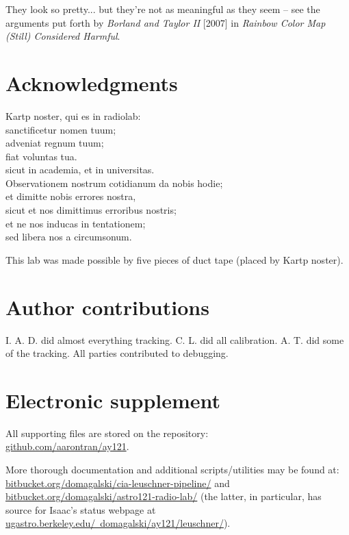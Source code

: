 \documentclass[10pt]{article}
\begin{document}
They look so pretty... but they're not as meaningful as they seem -- see the arguments put forth by \textit{Borland and Taylor II} [2007] in \textit{Rainbow Color Map (Still) Considered Harmful}.

\section{Acknowledgments}

\begin{center}
Kartp noster, qui es in radiolab:\\
sanctificetur nomen tuum;\\
adveniat regnum tuum;\\
fiat voluntas tua.\\
sicut in academia, et in universitas.\\
Observationem nostrum cotidianum da nobis hodie;\\
et dimitte nobis errores nostra,\\
sicut et nos dimittimus erroribus nostris;\\
et ne nos inducas in tentationem;\\
sed libera nos a circumsonum.
\end{center}

This lab was made possible by five pieces of duct tape (placed by Kartp noster).


\section{Author contributions}

I. A. D. did almost everything tracking.  C. L. did all calibration.  A. T. did some of the tracking.  All parties contributed to debugging.

\section{Electronic supplement}

All supporting files are stored on the repository:\\
\href{https://github.com/aarontran/ay121/lab4/}{github.com/aarontran/ay121}.

More thorough documentation and additional scripts/utilities may be found at:
\href{https://bitbucket.org/domagalski/cia-leuschner-pipeline/src}{bitbucket.org/domagalski/cia-leuschner-pipeline/} and
\href{https://bitbucket.org/domagalski/astro121-radio-lab/src/94a1d5725fa67ded6b111689c74a303ea254fa7c/lab-leuschner/?at=master}{bitbucket.org/domagalski/astro121-radio-lab/} (the latter, in particular, has source for Isaac's status webpage at \href{http://ugastro.berkeley.edu/~domagalski/ay121/leuschner/}{ugastro.berkeley.edu/~domagalski/ay121/leuschner/}).
\end{document}
